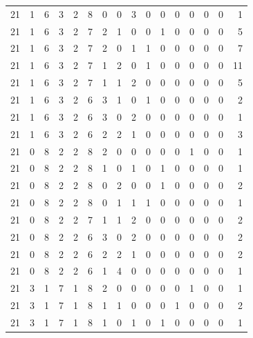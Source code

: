 \begin{appendix}
{\begin{longtable}{lrrrrrrrrrrrrrrr}
    21        & 1  & 6  & 3  & 2  & 8  & 0  & 0  & 3  & 0  & 0  & 0  & 0   & 0   & 0   & 1    \\
    21        & 1  & 6  & 3  & 2  & 7  & 2  & 1  & 0  & 0  & 1  & 0  & 0   & 0   & 0   & 5    \\
    21        & 1  & 6  & 3  & 2  & 7  & 2  & 0  & 1  & 1  & 0  & 0  & 0   & 0   & 0   & 7    \\
    21        & 1  & 6  & 3  & 2  & 7  & 1  & 2  & 0  & 1  & 0  & 0  & 0   & 0   & 0   & 11   \\
    21        & 1  & 6  & 3  & 2  & 7  & 1  & 1  & 2  & 0  & 0  & 0  & 0   & 0   & 0   & 5    \\
    21        & 1  & 6  & 3  & 2  & 6  & 3  & 1  & 0  & 1  & 0  & 0  & 0   & 0   & 0   & 2    \\
    21        & 1  & 6  & 3  & 2  & 6  & 3  & 0  & 2  & 0  & 0  & 0  & 0   & 0   & 0   & 1    \\
    21        & 1  & 6  & 3  & 2  & 6  & 2  & 2  & 1  & 0  & 0  & 0  & 0   & 0   & 0   & 3    \\
    21        & 0  & 8  & 2  & 2  & 8  & 2  & 0  & 0  & 0  & 0  & 0  & 1   & 0   & 0   & 1    \\
    21        & 0  & 8  & 2  & 2  & 8  & 1  & 0  & 1  & 0  & 1  & 0  & 0   & 0   & 0   & 1    \\
    21        & 0  & 8  & 2  & 2  & 8  & 0  & 2  & 0  & 0  & 1  & 0  & 0   & 0   & 0   & 2    \\
    21        & 0  & 8  & 2  & 2  & 8  & 0  & 1  & 1  & 1  & 0  & 0  & 0   & 0   & 0   & 1    \\
    21        & 0  & 8  & 2  & 2  & 7  & 1  & 1  & 2  & 0  & 0  & 0  & 0   & 0   & 0   & 2    \\
    21        & 0  & 8  & 2  & 2  & 6  & 3  & 0  & 2  & 0  & 0  & 0  & 0   & 0   & 0   & 2    \\
    21        & 0  & 8  & 2  & 2  & 6  & 2  & 2  & 1  & 0  & 0  & 0  & 0   & 0   & 0   & 2    \\
    21        & 0  & 8  & 2  & 2  & 6  & 1  & 4  & 0  & 0  & 0  & 0  & 0   & 0   & 0   & 1    \\
    21        & 3  & 1  & 7  & 1  & 8  & 2  & 0  & 0  & 0  & 0  & 0  & 1   & 0   & 0   & 1    \\
    21        & 3  & 1  & 7  & 1  & 8  & 1  & 1  & 0  & 0  & 0  & 1  & 0   & 0   & 0   & 2    \\
    21        & 3  & 1  & 7  & 1  & 8  & 1  & 0  & 1  & 0  & 1  & 0  & 0   & 0   & 0   & 1    \\

\end{longtable}}
\end{appendix}

